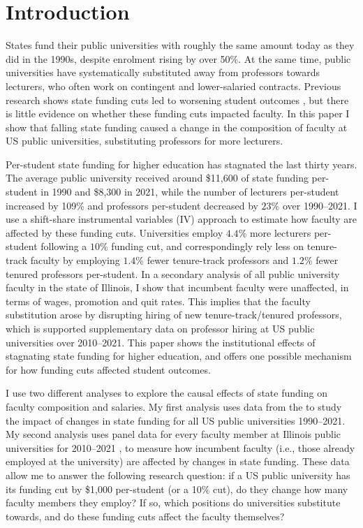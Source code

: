 \section{Introduction}
\label{sec:intro}
States fund their public universities with roughly the same amount today as they did in the 1990s, despite enrolment rising by over 50\%.
At the same time, public universities have systematically substituted away from professors towards lecturers, who often work on contingent and lower-salaried contracts.
Previous research shows state funding cuts led to worsening student outcomes \citep{NBERw23736,NBERw27885}, but there is little evidence on whether these funding cuts impacted faculty.
In this paper I show that falling state funding caused a change in the composition of faculty at US public universities, substituting professors for more lecturers.

Per-student state funding for higher education has stagnated the last thirty years.
The average public university received around \$11,600 of state funding per-student in 1990 and \$8,300 in 2021, while the number of lecturers per-student increased by 109\% and professors per-student decreased by $23$\% over 1990--2021.
I use a shift-share instrumental variables (IV) approach to estimate how faculty are affected by these funding cuts.
Universities employ $4.4$\% more lecturers per-student following a $10$\% funding cut, and correspondingly rely less on tenure-track faculty by employing $1.4$\% fewer tenure-track professors and $1.2$\% fewer tenured professors per-student.
In a secondary analysis of all public university faculty in the state of Illinois, I show that incumbent faculty were unaffected, in terms of wages, promotion and quit rates.
This implies that the faculty substitution arose by disrupting hiring of new tenure-track/tenured professors, which is supported supplementary data on professor hiring at US public universities over 2010--2021.
This paper shows the institutional effects of stagnating state funding for higher education, and offers one possible mechanism for how funding cuts affected student outcomes.

I use two different analyses to explore the causal effects of state funding on faculty composition and salaries.
My first analysis uses data from the \citet[IPEDS]{ipeds} to study the impact of changes in state funding for all US public universities 1990--2021.
My second analysis uses panel data for every faculty member at Illinois public universities for 2010--2021 \citet[IBHED]{ibhed}, to measure how incumbent faculty (i.e., those already employed at the university) are affected by changes in state funding.
These data allow me to answer the following research question: if a US public university has its funding cut by \$1,000 per-student (or a 10\% cut), do they change how many faculty members they employ?
If so, which positions do universities substitute towards, and do these funding cuts affect the faculty themselves?

